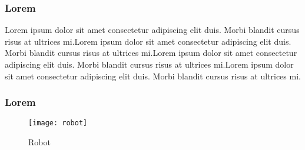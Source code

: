 \subsubsection{Lorem}
Lorem ipsum dolor sit amet consectetur adipiscing elit duis. Morbi blandit cursus risus at ultrices mi.Lorem ipsum dolor sit amet consectetur adipiscing elit duis. Morbi blandit cursus risus at ultrices mi.Lorem ipsum dolor sit amet consectetur adipiscing elit duis. Morbi blandit cursus risus at ultrices mi.Lorem ipsum dolor sit amet consectetur adipiscing elit duis. Morbi blandit cursus risus at ultrices mi.
\subsubsection{Lorem}
\begin{figure}[h]
 \centering
 \texttt{[image: robot]}
 \caption[Robot]{Robot}\label{fig:Robot}
\end{figure}
\newpage
